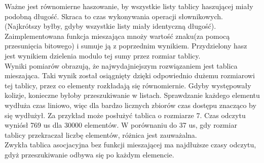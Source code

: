 \documentclass[12pt,a4paper]{article}
\begin{document}
Ważne jest równomierne haszowanie, by wszystkie listy tablicy haszującej miały podobną długość. Skraca to czas wykonywania operacji słownikowych. (Najkrótszy byłby, gdyby wszystkie listy miały identyczną długość).
\\

Zaimplementowana funkcja mieszająca mnoży wartość znaku(za pomocą przesunięcia bitowego) i sumuje ją z poprzednim wynikiem. Przydzielony hasz jest wynikiem dzielenia modulo tej sumy przez rozmiar tablicy.
\\

Wyniki pomiarów obrazują, że najwydajniejszym rozwiązaniem jest tablica mieszająca. Taki wynik został osiągnięty dzięki odpowiednio dużemu rozmiarowi tej tablicy, przez co elementy rozkładają się równomiernie. Gdyby występowały kolizje, konieczne byłoby przeszukiwanie w listach. Sprawdzanie każdego elementu wydłuża czas liniowo, więc dla bardzo licznych zbiorów czas dostępu znacząco by się wydłużył. Za przykład może posłużyć tablica o rozmiarze 7. Czas odczytu wyniósł 769 us dla 30000 elementów. W porównaniu do 37 us, gdy rozmiar tablicy przekraczał liczbę elementów, różnica jest zauważalna. \\

Zwykła tablica asocjacyjna bez funkcji mieszającej ma najdłuższe czasy odczytu, gdyż przeszukiwanie odbywa się po każdym elemencie.
\end{document}
